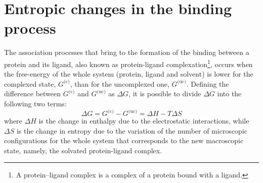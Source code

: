 \section{Entropic changes in the binding process}\label{sec:configurational-entropy}




The association processes that bring to the formation of the binding between a protein and its ligand, also known as protein-ligand complexation\footnote{A protein–ligand complex is a complex of a protein bound with a ligand.}, occurs when the free-energy of the whole system (protein, ligand and solvent) is lower for the complexed state, $G^\text{(c)}$, than for the uncomplexed one, $G^\text{(uc)}$. Defining the difference between $G^\text{(c)}$ and $G^\text{(uc)}$ as $\Delta G$, it is possible to divide $\Delta G$ into the following two terms:
\begin{equation*}
\label{free-en}
\Delta G = G^\text{(c)} - G^\text{(uc)} = \Delta H - T \Delta S
\end{equation*}
where $\Delta H$ is the change in enthalpy due to the electrostatic interactions, while $\Delta S$ is the change in entropy due to the variation of the number of microscopic configurations for the whole system that corresponds to the new macroscopic state, namely, the solvated protein-ligand complex.


